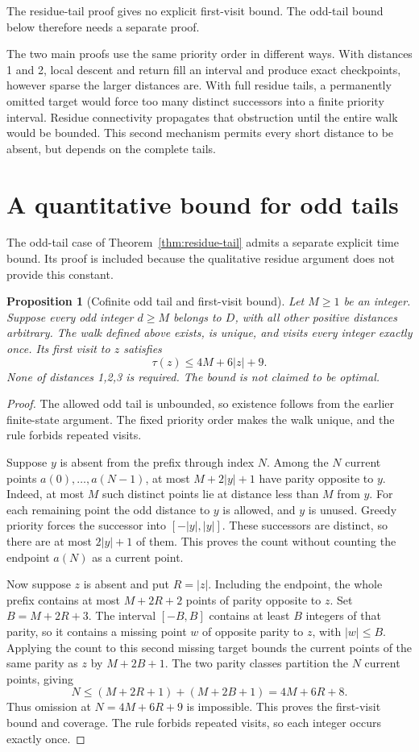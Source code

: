 \documentclass[11pt,a4paper]{article}
\newtheorem{proposition}[theorem]{Proposition}
\begin{document}
The residue-tail proof gives no explicit first-visit bound. The odd-tail
bound below therefore needs a separate proof.

The two main proofs use the same priority order in different ways.
With distances 1 and 2, local descent and return fill an interval and
produce exact checkpoints, however sparse the larger distances are.
With full residue tails, a permanently omitted target would force too
many distinct successors into a finite priority interval. Residue
connectivity propagates that obstruction until the entire walk would be
bounded. This second mechanism permits every short distance to be absent,
but depends on the complete tails.

\section{A quantitative bound for odd tails}\label{sec:odd-tail}
The odd-tail case of Theorem~\ref{thm:residue-tail} admits a separate
explicit time bound. Its proof is included because the qualitative residue
argument does not provide this constant.

\begin{proposition}[Cofinite odd tail and first-visit bound]\label{prop:odd-tail}
Let $M\ge1$ be an integer. Suppose every odd integer $d\ge M$ belongs
to $D$, with all other positive distances arbitrary. The walk defined above
exists, is unique, and visits every integer exactly once. Its first
visit to $z$ satisfies
\[
 \tau(z)\le 4M+6|z|+9.
\]
None of distances 1,2,3 is required. The bound is not claimed to be optimal.
\end{proposition}
\begin{proof}
The allowed odd tail is unbounded, so existence follows from the earlier
finite-state argument. The fixed priority order makes the walk unique, and
the rule forbids repeated visits.

Suppose $y$ is absent from the prefix through index $N$. Among the $N$
current points $a(0),\ldots,a(N-1)$, at most $M+2|y|+1$ have parity
opposite to $y$. Indeed, at most $M$ such distinct points lie at distance
less than $M$ from $y$. For each remaining point the odd distance to $y$
is allowed, and $y$ is unused. Greedy priority forces the successor into
$[-|y|,|y|]$. These successors are distinct, so there are at most
$2|y|+1$ of them. This proves the count without counting the endpoint
$a(N)$ as a current point.

Now suppose $z$ is absent and put $R=|z|$. Including the endpoint, the
whole prefix contains at most $M+2R+2$ points of parity opposite to $z$.
Set $B=M+2R+3$. The interval $[-B,B]$ contains at least $B$ integers of
that parity, so it contains a missing point $w$ of opposite parity to $z$,
with $|w|\le B$. Applying the count to this second missing target bounds
the current points of the same parity as $z$ by $M+2B+1$.
The two parity classes partition the $N$ current points, giving
\[
 N\le (M+2R+1)+(M+2B+1)=4M+6R+8.
\]
Thus omission at $N=4M+6R+9$ is impossible. This proves the first-visit
bound and coverage. The rule forbids repeated visits, so each integer occurs
exactly once.
\end{proof}
\end{document}
